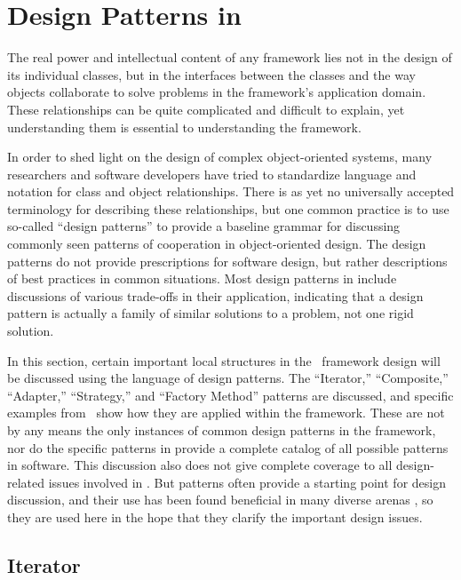 \section{Design Patterns in \aicat}

The real power and intellectual content of any framework lies not in
the design of its individual classes, but in the interfaces between
the classes and the way objects collaborate to solve problems in the
framework's application domain. \cite[p. 31]{fayad:99} These
relationships can be quite complicated and difficult to explain, yet
understanding them is essential to understanding the framework.

In order to shed light on the design of complex object-oriented
systems, many researchers and software developers have tried to
standardize language and notation for class and object relationships.
There is as yet no universally accepted terminology for describing
these relationships, but one common practice is to use so-called
``design patterns'' to provide a baseline grammar for discussing
commonly seen patterns of cooperation in object-oriented
design. \cite[p. 3]{gamma:95} The design patterns do not provide
prescriptions for software design, but rather descriptions of best
practices in common situations.  Most design patterns in
\cite{gamma:95} include discussions of various trade-offs in their
application, indicating that a design pattern is actually a family of
similar solutions to a problem, not one rigid solution.

In this section, certain important local structures in the \aicat\
framework design will be discussed using the language of design
patterns.  The ``Iterator,'' ``Composite,'' ``Adapter,'' ``Strategy,''
and ``Factory Method'' patterns are discussed, and specific examples
from \aicat\ show how they are applied within the framework.  These
are not by any means the only instances of common design patterns in
the framework, nor do the specific patterns in \cite{gamma:95} provide
a complete catalog of all possible patterns in software.  This
discussion also does not give complete coverage to all design-related
issues involved in \aicat.  But patterns often provide a starting
point for design discussion, and their use has been found beneficial
in many diverse arenas \cite{granlund:99}, so they are used here in
the hope that they clarify the important design issues.

\subsection{Iterator}

